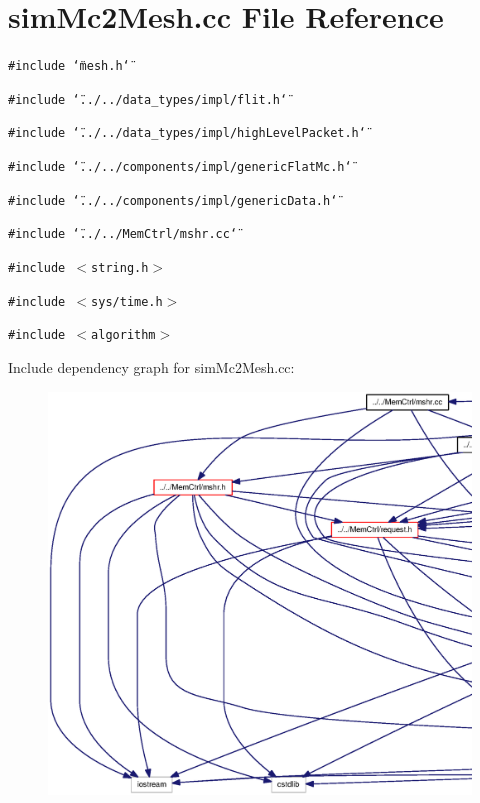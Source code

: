 \section{simMc2Mesh.cc File Reference}
\label{simMc2Mesh_8cc}
{\tt \#include \char`\"{}mesh.h\char`\"{}}\par
{\tt \#include \char`\"{}../../data\_\-types/impl/flit.h\char`\"{}}\par
{\tt \#include \char`\"{}../../data\_\-types/impl/highLevelPacket.h\char`\"{}}\par
{\tt \#include \char`\"{}../../components/impl/genericFlatMc.h\char`\"{}}\par
{\tt \#include \char`\"{}../../components/impl/genericData.h\char`\"{}}\par
{\tt \#include \char`\"{}../../MemCtrl/mshr.cc\char`\"{}}\par
{\tt \#include $<$string.h$>$}\par
{\tt \#include $<$sys/time.h$>$}\par
{\tt \#include $<$algorithm$>$}\par


Include dependency graph for simMc2Mesh.cc:\nopagebreak
\begin{figure}[H]
\begin{center}
\leavevmode
\includegraphics[width=420pt]{simMc2Mesh_8cc__incl}
\end{center}
\end{figure}
